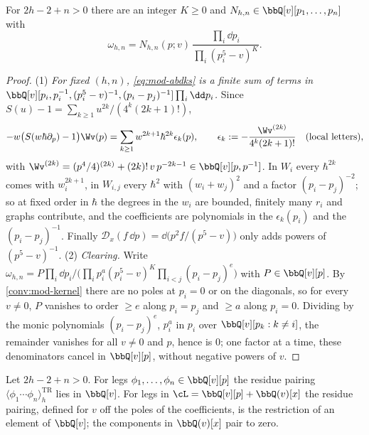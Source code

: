 \begin{lem}
\label{lem:mod-abdks}
For $2h-2+n>0$ there are an integer $K\geq 0$ and $N_{h,n}\in\bbQ[v][p_1,\dots,p_n]$ with
\[
\omega_{h,n}=N_{h,n}(p;v)\,\frac{\prod_i\dd p_i}{\prod_i(p_i^5-v)^K}.
\]
\end{lem}

\begin{proof}
(1) \emph{For fixed $(h,n)$, \eqref{eq:mod-abdks} is a finite sum of terms in $\bbQ[v][p_i,p_i^{-1},(p_i^5-v)^{-1},(p_i-p_j)^{-1}]\prod_i\dd p_i$.} Since $S(u)-1=\sum_{k\geq 1}u^{2k}/(4^k(2k+1)!)$,
\[
-w\big(S(w\hbar\partial_p)-1\big)\Wv(p)=\sum_{k\geq 1}w^{2k+1}\hbar^{2k}\epsilon_k(p),\qquad \epsilon_k:=-\frac{\Wv^{(2k)}}{4^k(2k+1)!}\quad(\text{local letters}),
\]
with $\Wv^{(2k)}=(p^4/4)^{(2k)}+(2k)!\,v\,p^{-2k-1}\in\bbQ[v][p,p^{-1}]$. In $W_i$ every $\hbar^{2k}$ comes with $w_i^{2k+1}$, in $W_{i,j}$ every $\hbar^2$ with $(w_i+w_j)^2$ and a factor $(p_i-p_j)^{-2}$; so at fixed order in $\hbar$ the degrees in the $w_i$ are bounded, finitely many $r_i$ and graphs contribute, and the coefficients are polynomials in the $\epsilon_k(p_i)$ and the $(p_i-p_j)^{-1}$. Finally $\mathcal D_x(f\,\dd p)=\dd\big(p^2f/(p^5-v)\big)$ only adds powers of $(p^5-v)^{-1}$. (2) \emph{Clearing.} Write $\omega_{h,n}=P\prod_i\dd p_i\big/\big(\prod_ip_i^{a}(p_i^5-v)^{K}\prod_{i<j}(p_i-p_j)^{e}\big)$ with $P\in\bbQ[v][p]$. By \cref{conv:mod-kernel} there are no poles at $p_i=0$ or on the diagonals, so for every $v\neq 0$, $P$ vanishes to order $\geq e$ along $p_i=p_j$ and $\geq a$ along $p_i=0$. Dividing by the monic polynomials $(p_i-p_j)^e$, $p_i^a$ in $p_i$ over $\bbQ[v][p_k:k\neq i]$, the remainder vanishes for all $v\neq 0$ and $p$, hence is $0$; one factor at a time, these denominators cancel in $\bbQ[v][p]$, without negative powers of $v$.
\end{proof}

\begin{thm}[L-regularity]
\label{thm:mod-Lreg}
Let $2h-2+n>0$. For legs $\phi_1,\dots,\phi_n\in\bbQ[v][p]$ the residue pairing $\langle\phi_1\cdots\phi_n\rangle^{\mathrm{TR}}_h$ lies in $\bbQ[v]$. For legs in $\cL=\bbQ[v][p]+\bbQ(v)[x]$ the residue pairing, defined for $v$ off the poles of the coefficients, is the restriction of an element of $\bbQ[v]$; the components in $\bbQ(v)[x]$ pair to zero.
\end{thm}

